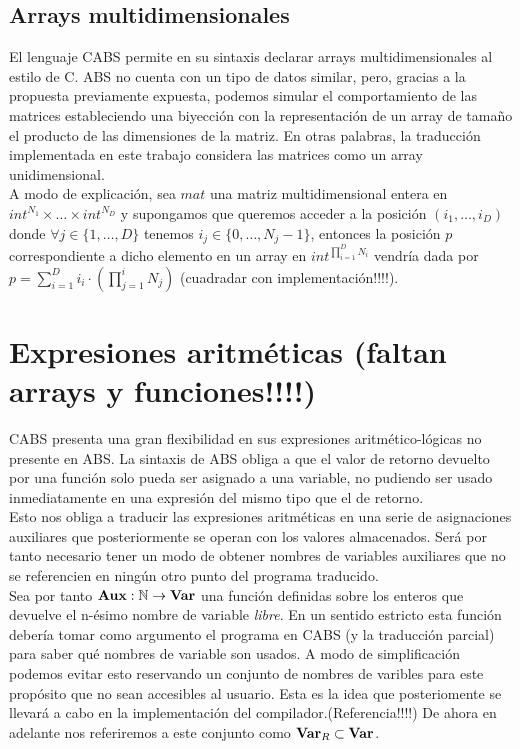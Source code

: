 

\subsection{Arrays multidimensionales}

El lenguaje CABS permite en su sintaxis declarar arrays multidimensionales al estilo de C. ABS no cuenta con un tipo de datos similar, pero, gracias a la propuesta previamente expuesta, podemos simular el comportamiento de las matrices estableciendo una biyección con la representación de un array de tamaño el producto de las dimensiones de la matriz. En otras palabras, la traducción implementada en este trabajo considera las matrices como un array unidimensional.\\

A modo de explicación, sea $mat$ una matriz multidimensional entera en $int^{N_1} \times \dots \times int^{N_D}$ y supongamos que queremos acceder a la posición $(i_1, \dots, i_D)$ donde $\forall j \in \{1, \dots, D\}$ tenemos $i_j \in \{0, \dots, N_j - 1\}$, entonces la posición $p$ correspondiente a dicho elemento en un array en $int^{\prod_{i = 1}^{D} N_i}$ vendría dada por $p = \sum_{i = 1}^{D} i_i \cdot (\prod_{j=1}^{i} N_j)$ (cuadradar con implementación!!!!).

\section{Expresiones aritméticas (faltan arrays y funciones!!!!)}

CABS presenta una gran flexibilidad en sus expresiones aritmético-lógicas no presente en ABS. La sintaxis de ABS obliga a que el valor de retorno devuelto por una función solo pueda ser asignado a una variable, no pudiendo ser usado inmediatamente en una expresión del mismo tipo que el de retorno.\\

Esto nos obliga a traducir las expresiones aritméticas en una serie de asignaciones auxiliares que posteriormente se operan con los valores almacenados. Será por tanto necesario tener un modo de obtener nombres de variables auxiliares que no se referencien en ningún otro punto del programa traducido.\\

Sea por tanto $\textbf{Aux}: \mathbb{N} \rightarrow \textbf{Var}$ una función definidas sobre los enteros que devuelve el n-ésimo nombre de variable {\it libre}. En un sentido estricto esta función debería tomar como argumento el programa en CABS (y la traducción parcial) para saber qué nombres de variable son usados. A modo de simplificación podemos evitar esto reservando un conjunto de nombres de varibles para este propósito que no sean accesibles al usuario. Esta es la idea que posteriomente se llevará a cabo en la implementación del compilador.(Referencia!!!!) De ahora en adelante nos referiremos a este conjunto como $\textbf{Var}_R \subset \textbf{Var}$.\\

